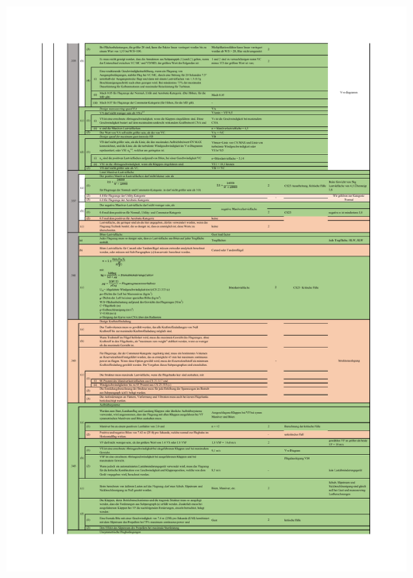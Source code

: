 \begin{table}[H]
\centering
\includegraphics[width=1.0\textwidth, trim={19mm 15mm 15mm 19mm}, clip]{bilder/Tabellen/MPP_Konstruktion_2.pdf}
\end{table}

